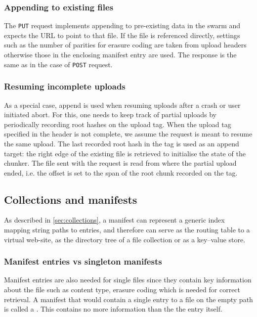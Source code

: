 \subsubsection{Appending to existing files}\label{sec:append}

The \lstinline{PUT} request implements appending to pre-existing data in the swarm and expects the URL to point to that file. If the file is referenced directly, settings such as the number of parities for erasure coding are taken from upload headers otherwise those in the enclosing manifest entry are used. The response is the same as in the case of \lstinline{POST} request.


\subsubsection{Resuming incomplete uploads}\label{sec:resume}

As a special case, append is used when resuming uploads after a crash or user initiated abort. For this, one needs to keep track of partial uploads by periodically recording root hashes on the upload tag. When the upload tag specified in the header is not complete, we assume the request is meant to resume the same upload. The last recorded root hash in the tag is used as an append target: the right edge of the existing file is retrieved to initialise the state of the chunker. The file sent with the request is read from where the partial upload ended, i.e. the offset is set to the span of the root chunk recorded on the tag.

\subsection{Collections and manifests \statusgreen}\label{sec:manifests-ux}

As described in \ref{sec:collections}, a manifest can represent a generic index mapping string paths to entries, and therefore can serve as the routing table to a virtual web-site, as the directory tree of a file collection or as a key--value store. 

\subsubsection{Manifest entries vs singleton manifests}

Manifest entries are also needed for single files since they contain key information about the file such as content type, erasure coding which is needed for correct retrieval. A manifest that would contain a single entry to a file on  the empty path is called a . This contains no more information than the the entry itself.  


